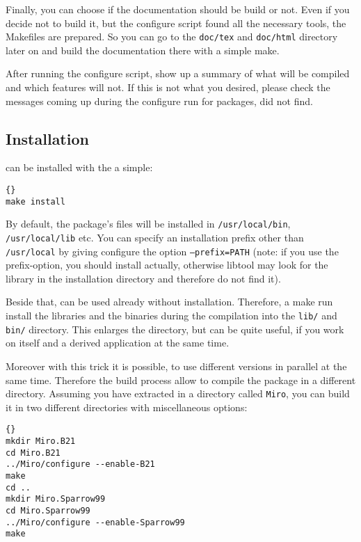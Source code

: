 Finally, you can choose if the documentation should be build or not.
Even if you decide not to build it, but the configure script found all
the necessary tools, the Makefiles are prepared. So you can go to the
\texttt{doc/tex} and \texttt{doc/html} directory later on and build
the documentation there with a simple make.

After running the configure script, \miro show up a summary of what
will be compiled and which features will not. If this is not what you
desired, please check the messages coming up during the configure run
for packages, \miro did not find.

\subsection{Installation}

\miro can be installed with the a simple:

\begin{lstlisting}[frame=tb]{}
make install
\end{lstlisting}

By default, the package's files will be installed in \texttt{/usr/local/bin},
\texttt{/usr/local/lib} etc.  You can specify an installation prefix other
than \texttt{/usr/local} by giving configure the option
\texttt{--prefix=PATH} (note: if you use the prefix-option, you should
install \miro actually, otherwise libtool may look for the library in
the installation directory and therefore do not find it).

Beside that, \miro can be used already without installation. Therefore,
a make run install the libraries and the binaries during the
compilation into the \texttt{lib/} and \texttt{bin/} directory. This
enlarges the \miro directory, but can be quite useful, if you work on
\miro itself and a derived application at the same time.

Moreover with this trick it is possible, to use different \miro
versions in parallel at the same time. Therefore the build process
allow to compile the package in a different directory. Assuming you
have extracted \miro in a directory called \texttt{Miro}, you can
build it in two different directories with miscellaneous options:

\begin{lstlisting}[frame=tb]{}
mkdir Miro.B21
cd Miro.B21
../Miro/configure --enable-B21
make
cd ..
mkdir Miro.Sparrow99
cd Miro.Sparrow99
../Miro/configure --enable-Sparrow99
make
\end{lstlisting}

